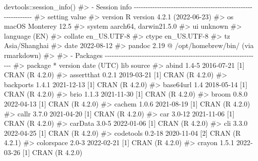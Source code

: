 \documentclass[
  11pt,
  letterpaper,
  DIV=11,
  numbers=noendperiod]{scrartcl}
\newenvironment{Shaded}{}{}
\newcommand{\CommentTok}[1]{\textcolor[rgb]{0.42,0.45,0.49}{#1}}
\newcommand{\FunctionTok}[1]{\textcolor[rgb]{0.44,0.26,0.76}{#1}}
\newcommand{\NormalTok}[1]{\textcolor[rgb]{0.14,0.16,0.18}{#1}}
\newcommand{\SpecialCharTok}[1]{\textcolor[rgb]{0.00,0.36,0.77}{#1}}
\begin{document}
\begin{Shaded}
\begin{Highlighting}[]
\NormalTok{devtools}\SpecialCharTok{::}\FunctionTok{session\_info}\NormalTok{()}
\CommentTok{\#\textgreater{} {-} Session info {-}{-}{-}{-}{-}{-}{-}{-}{-}{-}{-}{-}{-}{-}{-}{-}{-}{-}{-}{-}{-}{-}{-}{-}{-}{-}{-}{-}{-}{-}{-}{-}{-}{-}{-}{-}{-}{-}{-}{-}{-}{-}{-}{-}{-}{-}{-}{-}{-}{-}{-}{-}{-}{-}{-}{-}{-}{-}{-}{-}{-}{-}{-}}
\CommentTok{\#\textgreater{}  setting  value}
\CommentTok{\#\textgreater{}  version  R version 4.2.1 (2022{-}06{-}23)}
\CommentTok{\#\textgreater{}  os       macOS Monterey 12.5}
\CommentTok{\#\textgreater{}  system   aarch64, darwin21.5.0}
\CommentTok{\#\textgreater{}  ui       unknown}
\CommentTok{\#\textgreater{}  language (EN)}
\CommentTok{\#\textgreater{}  collate  en\_US.UTF{-}8}
\CommentTok{\#\textgreater{}  ctype    en\_US.UTF{-}8}
\CommentTok{\#\textgreater{}  tz       Asia/Shanghai}
\CommentTok{\#\textgreater{}  date     2022{-}08{-}12}
\CommentTok{\#\textgreater{}  pandoc   2.19 @ /opt/homebrew/bin/ (via rmarkdown)}
\CommentTok{\#\textgreater{} }
\CommentTok{\#\textgreater{} {-} Packages {-}{-}{-}{-}{-}{-}{-}{-}{-}{-}{-}{-}{-}{-}{-}{-}{-}{-}{-}{-}{-}{-}{-}{-}{-}{-}{-}{-}{-}{-}{-}{-}{-}{-}{-}{-}{-}{-}{-}{-}{-}{-}{-}{-}{-}{-}{-}{-}{-}{-}{-}{-}{-}{-}{-}{-}{-}{-}{-}{-}{-}{-}{-}{-}{-}{-}{-}}
\CommentTok{\#\textgreater{}  package     * version   date (UTC) lib source}
\CommentTok{\#\textgreater{}  abind         1.4{-}5     2016{-}07{-}21 [1] CRAN (R 4.2.0)}
\CommentTok{\#\textgreater{}  assertthat    0.2.1     2019{-}03{-}21 [1] CRAN (R 4.2.0)}
\CommentTok{\#\textgreater{}  backports     1.4.1     2021{-}12{-}13 [1] CRAN (R 4.2.0)}
\CommentTok{\#\textgreater{}  base64url     1.4       2018{-}05{-}14 [1] CRAN (R 4.2.0)}
\CommentTok{\#\textgreater{}  brio          1.1.3     2021{-}11{-}30 [1] CRAN (R 4.2.0)}
\CommentTok{\#\textgreater{}  broom         0.8.0     2022{-}04{-}13 [1] CRAN (R 4.2.0)}
\CommentTok{\#\textgreater{}  cachem        1.0.6     2021{-}08{-}19 [1] CRAN (R 4.2.0)}
\CommentTok{\#\textgreater{}  callr         3.7.0     2021{-}04{-}20 [1] CRAN (R 4.2.0)}
\CommentTok{\#\textgreater{}  car           3.0{-}12    2021{-}11{-}06 [1] CRAN (R 4.2.0)}
\CommentTok{\#\textgreater{}  carData       3.0{-}5     2022{-}01{-}06 [1] CRAN (R 4.2.0)}
\CommentTok{\#\textgreater{}  cli           3.3.0     2022{-}04{-}25 [1] CRAN (R 4.2.0)}
\CommentTok{\#\textgreater{}  codetools     0.2{-}18    2020{-}11{-}04 [2] CRAN (R 4.2.1)}
\CommentTok{\#\textgreater{}  colorspace    2.0{-}3     2022{-}02{-}21 [1] CRAN (R 4.2.0)}
\CommentTok{\#\textgreater{}  crayon        1.5.1     2022{-}03{-}26 [1] CRAN (R 4.2.0)}

\end{Highlighting}
\end{Shaded}
\end{document}
